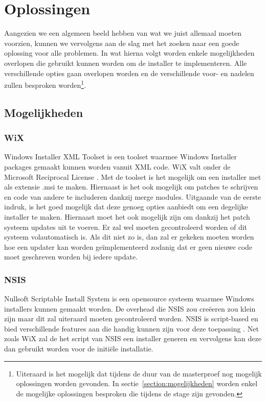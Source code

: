 \documentclass{article}
\begin{document}
\section{Oplossingen}
Aangezien we een algemeen beeld hebben van wat we juist allemaal moeten voorzien, kunnen we vervolgens aan de slag met het zoeken naar een goede oplossing voor alle problemen.
In wat hierna volgt worden enkele mogelijkheden overlopen die gebruikt kunnen worden om de installer te implementeren.
Alle verschillende opties gaan overlopen worden en de verschillende voor- en nadelen zullen besproken worden\footnote{Uiteraard is het mogelijk dat tijdens de duur van de masterproef nog mogelijk oplossingen worden gevonden.
In sectie~\vref{section:mogelijkheden} worden enkel de mogelijke oplossingen besproken die tijdens de stage zijn gevonden.}.

\subsection{Mogelijkheden}\label{section:mogelijkheden}
\subsubsection{WiX \citep{wixMain}}
Windows Installer XML Toolset is een toolset waarmee Windows Installer packages gemaakt kunnen worden vanuit XML code.
WiX valt onder de Microsoft Reciprocal License \citep{wixLicense}.
Met de toolset is het mogelijk om een installer met als extensie .msi te maken.
Hiernaast is het ook mogelijk om patches te schrijven en code van andere te includeren dankzij merge modules\citep{wixMergers}.
Uitgaande van de eerste indruk, is het goed mogelijk dat deze genoeg opties aanbiedt om een degelijke installer te maken.
Hiernaast moet het ook mogelijk zijn om dankzij het patch systeem updates uit te voeren.
Er zal wel moeten gecontroleerd worden of dit systeem volautomatisch is.
Als dit niet zo is, dan zal er gekeken moeten worden hoe een updater kan worden ge\"implementeerd zodanig dat er geen nieuwe code moet geschreven worden bij iedere update.

\subsubsection{NSIS \citep{nsisMain}}
Nullsoft Scriptable Install System is een opensource systeem waarmee Windows installers kunnen gemaakt worden.
De overhead die NSIS zou cre\"eeren zou klein zijn maar dit zal uiteraard moeten gecontroleerd worden. 
NSIS is script-based en bied verschillende features aan die handig kunnen zijn voor deze toepassing \citep{nsisFeatures}.
Net zoals WiX zal de het script van NSIS een installer generen en vervolgens kan deze dan gebruikt worden voor de initi\"ele installatie.
\end{document}
